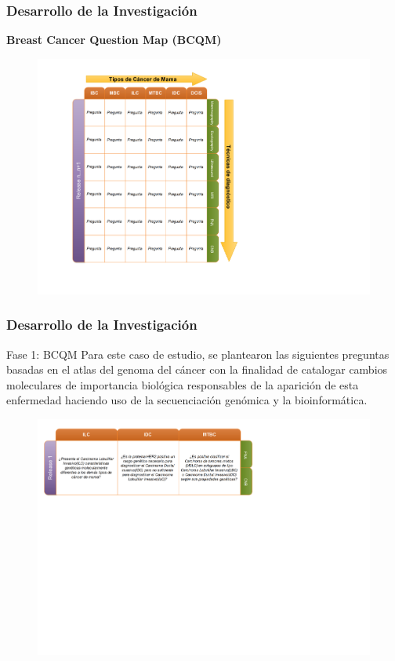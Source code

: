 \documentclass[xcolor=dvipsnames,xcolor=table,10pt]{beamer} %
\begin{document}
\begin{frame}
	\frametitle{Desarrollo de la Investigación}{\textbf{Breast Cancer Question Map (BCQM)}}
	\begin{figure}[h!]
		\centering
		\includegraphics[width=0.5\linewidth]{IMAGENES/BCQM_SPANISH}
	\end{figure}
\end{frame}	

\begin{frame}
	\frametitle{Desarrollo de la Investigación}
	\begin{block}{Fase 1: BCQM}\justifying
	Para este caso de estudio, se plantearon las siguientes preguntas  basadas en el atlas del genoma del cáncer con la finalidad de catalogar cambios moleculares de importancia biológica responsables de la aparición de esta enfermedad haciendo uso de la secuenciación genómica y la bioinformática.

	\end{block}
	
	\begin{figure}[h!]
		\centering
		\includegraphics[width=0.93\linewidth]{IMAGENES/BCQM_TCGA}
	\end{figure}
\end{frame}
\end{document}
